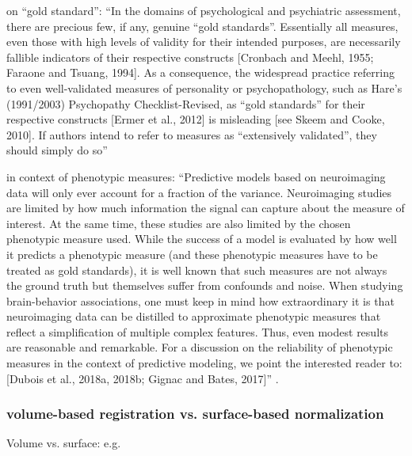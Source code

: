 \citet{lilienfeld2015fifty} on ``gold standard'': ``In the domains of
psychological and psychiatric assessment, there are precious few, if any,
genuine ``gold standards''. Essentially all measures, even those with high
levels of validity for their intended purposes, are necessarily fallible
indicators of their respective constructs [Cronbach and Meehl, 1955; Faraone and
Tsuang, 1994]. As a consequence, the widespread practice referring to even
well-validated measures of personality or psychopathology, such as Hare’s
(1991/2003) Psychopathy Checklist-Revised, as ``gold standards'' for their
respective constructs [Ermer et al., 2012] is misleading [see Skeem and Cooke,
2010]. If authors intend to refer to measures as ``extensively validated'', they
should simply do so'' \citep{lilienfeld2015fifty}

\citet{scheinost2019ten} in context of phenotypic measures: ``Predictive models
based on neuroimaging data will only ever account for a fraction of the
variance. Neuroimaging studies are limited by how much information the signal
can capture about the measure of interest. At the same time, these studies are
also limited by the chosen phenotypic measure used.  While the success of a
model is evaluated by how well it predicts a phenotypic measure (and these
phenotypic measures have to be treated as gold standards), it is well known that
such measures are not always the ground truth but themselves suffer from
confounds and noise.  When studying brain-behavior associations, one must keep
in mind how extraordinary it is that neuroimaging data can be distilled to
approximate phenotypic measures that reflect a simplification of multiple
complex features. Thus, even modest results are reasonable and remarkable. For
a discussion on the reliability of phenotypic measures in the context of
predictive modeling, we point the interested reader to: [Dubois et al., 2018a,
2018b; Gignac and Bates, 2017]'' \citep{scheinost2019ten}.


\subsubsection{volume-based registration vs. surface-based normalization}
%


Volume vs. surface: e.g. \citep{desai2005volumetric}

